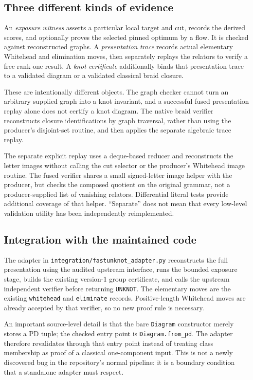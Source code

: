 \documentclass[11pt,letterpaper]{article}
\theoremstyle{definition}\newtheorem{definition}[theorem]{Definition}
\begin{document}
\subsection{Three different kinds of evidence}
An \emph{exposure witness} asserts a particular local target and cut, records the derived scores, and optionally proves the selected pinned optimum by a flow. It is checked against reconstructed graphs. A \emph{presentation trace} records actual elementary Whitehead and elimination moves, then separately replays the relators to verify a free-rank-one result. A \emph{knot certificate} additionally binds that presentation trace to a validated diagram or a validated classical braid closure.

These are intentionally different objects. The graph checker cannot turn an arbitrary supplied graph into a knot invariant, and a successful fused presentation replay alone does not certify a knot diagram. The native braid verifier reconstructs closure identifications by graph traversal, rather than using the producer's disjoint-set routine, and then applies the separate algebraic trace replay.

The separate explicit replay uses a deque-based reducer and reconstructs the letter images without calling the cut selector or the producer's Whitehead image routine. The fused verifier shares a small signed-letter image helper with the producer, but checks the composed quotient on the original grammar, not a producer-supplied list of vanishing relators. Differential literal tests provide additional coverage of that helper. ``Separate'' does not mean that every low-level validation utility has been independently reimplemented.

\subsection{Integration with the maintained code}
The adapter in \texttt{integration/fastunknot\_adapter.py} reconstructs the full presentation using the audited upstream interface, runs the bounded exposure stage, builds the existing version-1 group certificate, and calls the upstream independent verifier before returning \texttt{UNKNOT}. The elementary moves are the existing \texttt{whitehead} and \texttt{eliminate} records. Positive-length Whitehead moves are already accepted by that verifier, so no new proof rule is necessary.

An important source-level detail is that the bare \texttt{Diagram} constructor merely stores a PD tuple; the checked entry point is \texttt{Diagram.from\_pd}. The adapter therefore revalidates through that entry point instead of treating class membership as proof of a classical one-component input. This is not a newly discovered bug in the repository's normal pipeline: it is a boundary condition that a standalone adapter must respect.
\end{document}

